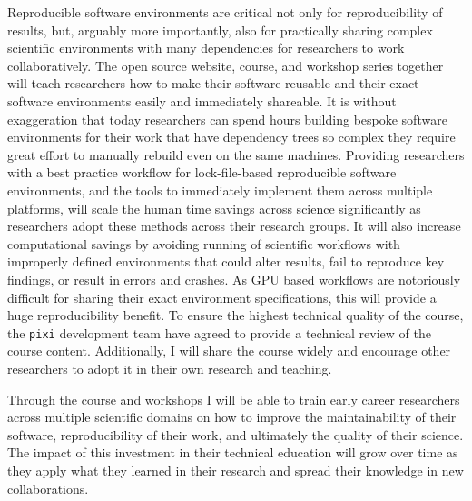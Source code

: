 \documentclass[letterpaper, 11pt]{article}
\newcommand{\pixi}{\texttt{pixi}}
\begin{document}

Reproducible software environments are critical not only for reproducibility of results, but, arguably more importantly, also for practically sharing complex scientific environments with many dependencies for researchers to work collaboratively.
The open source website, course, and workshop series together will teach researchers how to make their software reusable and their exact software environments easily and immediately shareable.
It is without exaggeration that today researchers can spend hours building bespoke software environments for their work that have dependency trees so complex they require great effort to manually rebuild even on the same machines.
Providing researchers with a best practice workflow for lock-file-based reproducible software environments, and the tools to immediately implement them across multiple platforms, will scale the human time savings across science significantly as researchers adopt these methods across their research groups.
It will also increase computational savings by avoiding running of scientific workflows with improperly defined environments that could alter results, fail to reproduce key findings, or result in errors and crashes.
As GPU based workflows are notoriously difficult for sharing their exact environment specifications, this will provide a huge reproducibility benefit.
To ensure the highest technical quality of the course, the \pixi{} development team have agreed to provide a technical review of the course content.
Additionally, I will share the course widely and encourage other researchers to adopt it in their own research and teaching.

Through the course and workshops I will be able to train early career researchers across multiple scientific domains on how to improve the maintainability of their software, reproducibility of their work, and ultimately the quality of their science.
The impact of this investment in their technical education will grow over time as they apply what they learned in their research and spread their knowledge in new collaborations.
\end{document}
